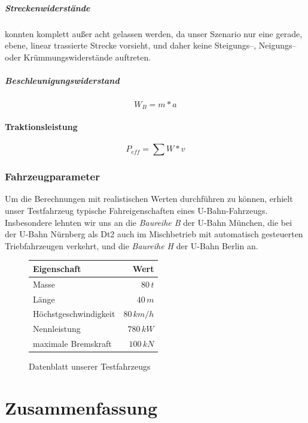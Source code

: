 \documentclass[10pt,a4paper]{article}
\begin{document}
\subparagraph{Streckenwiderstände} konnten komplett außer acht gelassen werden, da unser Szenario nur eine gerade, ebene, linear trassierte Strecke vorsieht, und daher keine Steigungs--, Neigungs-- oder Krümmungswiderstände auftreten.

\subparagraph{Beschleunigungswiderstand}
\begin{equation}
W_B = m * a
\end{equation}

\paragraph{Traktionsleistung}
\begin{equation}
P_{eff} = \sum W * v
\end{equation}

\subsubsection{Fahrzeugparameter}
Um die Berechnungen mit realistischen Werten durchführen zu können, erhielt unser Testfahrzeug typische Fahreigenschaften eines U-Bahn-Fahrzeugs. Insbesondere lehnten wir uns an die \textit{Baureihe B} der U-Bahn München, die bei der U-Bahn Nürnberg als Dt2 auch im Mischbetrieb mit automatisch gesteuerten Triebfahrzeugen verkehrt, und die \textit{Baureihe H} der U-Bahn Berlin an.

\begin{figure}[h]
\begin{center}
\begin{tabular}{|lr|}
\hline \textbf{Eigenschaft} & \textbf{Wert} \\ 
\hline Masse & $ 80\, t$ \\ 
\hline Länge & $ 40\, m$ \\ 
\hline Höchstgeschwindigkeit & $ 80 \, km/h $ \\ 
\hline Nennleistung & $ 780 \, kW $ \\ 
\hline maximale Bremskraft & $ 100 \, kN $ \\ 
\hline 
\end{tabular} 
\end{center}
\caption{Datenblatt unserer Testfahrzeugs}
\label{datenblatt}
\end{figure}

\section{Zusammenfassung}
 
\end{document}
